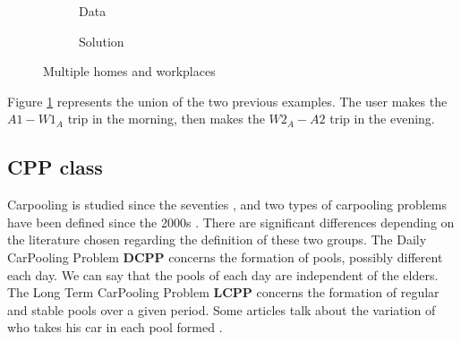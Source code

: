 \documentclass[12pt, a4paper, twoside]{memoir}
\newcommand\tab[1][1cm]{\hspace*{#1}}
\begin{document}
{	\begin{figure}[H]
		\centering
		\begin{subfigure}{.5\textwidth}
			\centering
			\caption{ Data }
		\end{subfigure}%
		\begin{subfigure}{.5\textwidth}
			\centering
			\caption{ Solution }
		\end{subfigure}
		\caption{Multiple homes and workplaces}
		\label{fig:Several homes and workplaces}
	\end{figure}
	
	Figure \ref{fig:Several homes and workplaces} represents the union of the two previous examples. The user makes the $A1-W1_A$ trip in the morning, then makes the $W2_A-A2$ trip in the evening.
	
	\subsection{CPP class}
	
	Carpooling is studied since the seventies \cite{wohlmethodology1970} \cite{sagnerimpact1974}, and two types of carpooling problems have been defined since the 2000s \cite{kotharigenghis-multiagent2004} \cite{maniezzoants2004} \cite{calvodistributed2004}. There are significant differences depending on the literature chosen regarding the definition of these two groups.\newline
		\tab The Daily CarPooling Problem \textbf{DCPP} concerns the formation of pools, possibly different each day. We can say that the pools of each day are independent of the elders.\newline
		\tab The Long Term CarPooling Problem \textbf{LCPP} concerns the formation of regular and stable pools over a given period. Some articles talk about the variation of who takes his car in each pool formed \cite{guometaheuristics2012}. 
	
}
\end{document}
